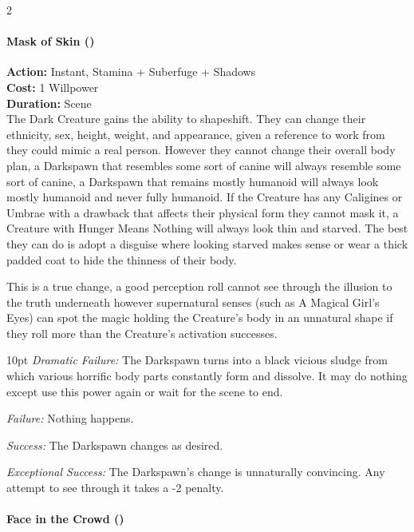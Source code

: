 \begin{multicols}{2}
\paragraph*{Mask of Skin (\textbullet\textbullet\textbullet)}

\noindent \textbf{Action:} Instant, Stamina + Suberfuge + Shadows\\

\noindent \textbf{Cost:} 1 Willpower\\

\noindent \textbf{Duration:} Scene \\

\noindent The Dark Creature gains the ability to shapeshift. They can change their ethnicity, sex, height, weight, and appearance, given a reference to work from they could mimic a real person. However they cannot change their overall body plan, a Darkspawn that resembles some sort of canine will always resemble some sort of canine, a Darkspawn that remains mostly humanoid will always look mostly humanoid and never fully humanoid. If the Creature has any Caligines or Umbrae with a drawback that affects their physical form they cannot mask it, a Creature with Hunger Means Nothing will always look thin and starved. The best they can do is adopt a disguise where looking starved makes sense or wear a thick padded coat to hide the thinness of their body.

This is a true change, a good perception roll cannot see through the illusion to the truth underneath however supernatural senses (such as A Magical Girl's Eyes) can spot the magic holding the Creature's body in an unnatural shape if they roll more than the Creature's activation successes.

\begin{myindentpar}{10pt} \emph{Dramatic Failure:} The Darkspawn turns into a black vicious sludge from which various horrific body parts constantly form and dissolve. It may do nothing except use this power again or wait for the scene to end. 

\emph{Failure:} Nothing happens.

\emph{Success:} The Darkspawn changes as desired. 

\emph{Exceptional Success:} The Darkspawn's change is unnaturally convincing. Any attempt to see through it takes a -2 penalty. \end{myindentpar}

\paragraph*{Face in the Crowd (\textbullet\textbullet\textbullet\textbullet)}


\end{multicols}
